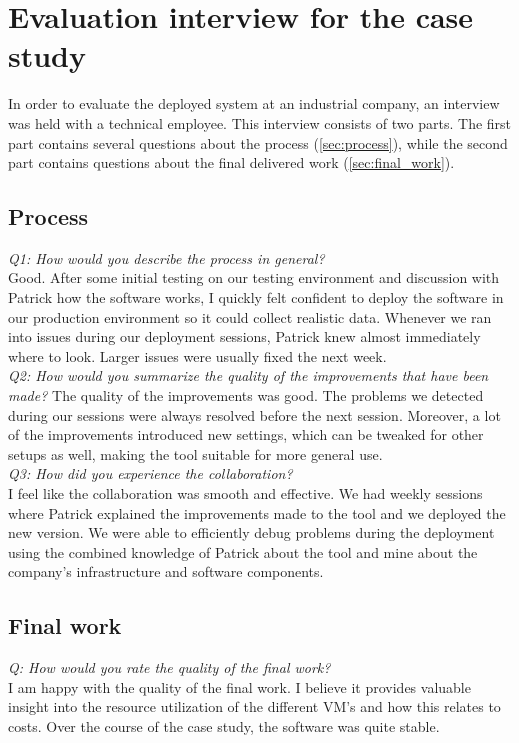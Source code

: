 \chapter{Evaluation interview for the case study} 
\label{ch:interview}
In order to evaluate the deployed system at an industrial company, an interview was held with a technical employee. This interview consists of two parts. The first part contains several questions about the process (\autoref{sec:process}), while the second part contains questions about the final delivered work (\autoref{sec:final_work}).

\section{Process} \label{sec:process}
\textit{Q1: How would you describe the process in general?}\\
Good. After some initial testing on our testing environment and discussion with Patrick how the software works, I quickly felt confident to deploy the software in our production environment so it could collect realistic data.
Whenever we ran into issues during our deployment sessions, Patrick knew almost immediately where to look. Larger issues were usually fixed the next week.\\

\noindent
\textit{Q2: How would you summarize the quality of the improvements that have been made?}
The quality of the improvements was good. The problems we detected during our sessions were always resolved before the next session.
Moreover, a lot of the improvements introduced new settings, which can be tweaked for other setups as well, making the tool suitable for more general use.\\

\noindent
\textit{Q3: How did you experience the collaboration?}\\
I feel like the collaboration was smooth and effective. We had weekly sessions where Patrick explained the improvements made to the tool and we deployed the new version.
We were able to efficiently debug problems during the deployment using the combined knowledge of Patrick about the tool and mine about the company's infrastructure and software components.

\section{Final work} \label{sec:final_work}
\noindent
\textit{Q: How would you rate the quality of the final work?}\\
I am happy with the quality of the final work. I believe it provides valuable insight into the resource utilization of the different VM's and how this relates to costs.
Over the course of the case study, the software was quite stable.\\

